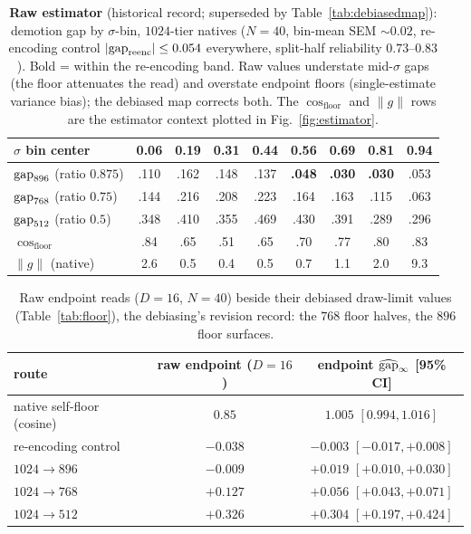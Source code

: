 \begin{table}[h]
\caption{\textbf{Raw estimator} (historical record; superseded by
Table~\ref{tab:debiasedmap}): demotion gap by
$\sigma$-bin, $1024$-tier natives ($N{=}40$,
bin-mean SEM ${\sim}0.02$, re-encoding control $|\mathrm{gap}_{\mathrm{reenc}}| \le 0.054$
everywhere, split-half reliability $0.73$--$0.83$). Bold = within the
re-encoding band. Raw values understate mid-$\sigma$ gaps (the floor
attenuates the read) and overstate endpoint floors (single-estimate
variance bias); the debiased map corrects both. The $\cos_{\mathrm{floor}}$
and $\|g\|$ rows are the estimator context plotted in
Fig.~\ref{fig:estimator}.}
\label{tab:phase0}
\centering
\small
\begin{tabular}{lcccccccc}
\toprule
$\sigma$ bin center & 0.06 & 0.19 & 0.31 & 0.44 & 0.56 & 0.69 & 0.81 & 0.94 \\
\midrule
$\mathrm{gap}_{896}$ (ratio $0.875$) & .110 & .162 & .148 & .137 & \textbf{.048} & \textbf{.030} & \textbf{.030} & .053 \\
$\mathrm{gap}_{768}$ (ratio $0.75$)  & .144 & .216 & .208 & .223 & .164 & .163 & .115 & .063 \\
$\mathrm{gap}_{512}$ (ratio $0.5$)   & .348 & .410 & .355 & .469 & .430 & .391 & .289 & .296 \\
\midrule
$\cos_{\mathrm{floor}}$ & .84 & .65 & .51 & .65 & .70 & .77 & .80 & .83 \\
$\|g\|$ (native) & 2.6 & 0.5 & 0.4 & 0.5 & 0.7 & 1.1 & 2.0 & 9.3 \\
\bottomrule
\end{tabular}
\end{table}

\begin{table}[h]
\caption{Raw endpoint reads ($D{=}16$, $N{=}40$) beside their debiased
draw-limit values (Table~\ref{tab:floor}), the debiasing's revision
record: the $768$ floor halves, the $896$ floor surfaces.}
\label{tab:rawendpoint}
\centering
\small
\begin{tabular}{lcc}
\toprule
route & raw endpoint ($D{=}16$) & endpoint $\widehat{\mathrm{gap}}_\infty$ [95\% CI] \\
\midrule
native self-floor (cosine) & $0.85$ & $1.005$ $[0.994, 1.016]$ \\
re-encoding control & $-0.038$ & $-0.003$ $[-0.017, +0.008]$ \\
$1024{\to}896$ & $-0.009$ & $+0.019$ $[+0.010, +0.030]$ \\
$1024{\to}768$ & $+0.127$ & $+0.056$ $[+0.043, +0.071]$ \\
$1024{\to}512$ & $+0.326$ & $+0.304$ $[+0.197, +0.424]$ \\
\bottomrule
\end{tabular}
\end{table}

